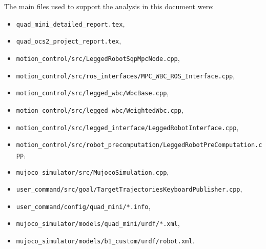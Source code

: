 \documentclass[11pt,a4paper]{article}
\newcommand{\code}[1]{\texttt{#1}}
\begin{document}
The main files used to support the analysis in this document were:
\begin{itemize}[leftmargin=*]
  \item \code{quad\_mini\_detailed\_report.tex},
  \item \code{quad\_ocs2\_project\_report.tex},
  \item \code{motion\_control/src/LeggedRobotSqpMpcNode.cpp},
  \item \code{motion\_control/src/ros\_interfaces/MPC\_WBC\_ROS\_Interface.cpp},
  \item \code{motion\_control/src/legged\_wbc/WbcBase.cpp},
  \item \code{motion\_control/src/legged\_wbc/WeightedWbc.cpp},
  \item \code{motion\_control/src/legged\_interface/LeggedRobotInterface.cpp},
  \item \code{motion\_control/src/robot\_precomputation/LeggedRobotPreComputation.cpp},
  \item \code{mujoco\_simulator/src/MujocoSimulation.cpp},
  \item \code{user\_command/src/goal/TargetTrajectoriesKeyboardPublisher.cpp},
  \item \code{user\_command/config/quad\_mini/*.info},
  \item \code{mujoco\_simulator/models/quad\_mini/urdf/*.xml},
  \item \code{mujoco\_simulator/models/b1\_custom/urdf/robot.xml}.
\end{itemize}
\end{document}
